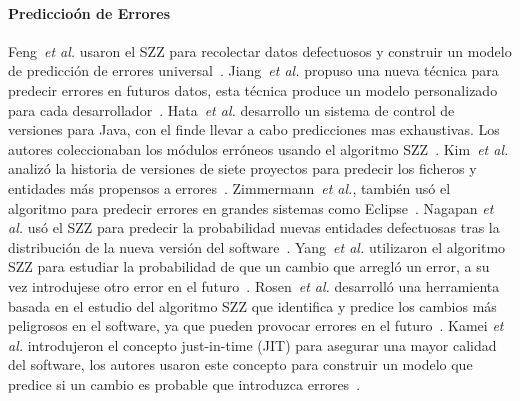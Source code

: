 \documentclass[a4paper, 12pt]{book}
\begin{document}
\paragraph{Prediccio\'on de Errores}
Feng~\textit{et al.} usaron el SZZ para recolectar datos defectuosos y construir un modelo de predicci\'on de errores universal~\cite{zhang2014towards}. Jiang~\textit{et al.} propuso una nueva t\'ecnica para predecir errores en futuros datos, esta t\'ecnica produce un modelo personalizado para cada desarrollador~\cite{jiang2013personalized}.
Hata~\textit{et al.} desarrollo un sistema de control de versiones  para Java, con el finde llevar a cabo predicciones mas exhaustivas. Los autores coleccionaban los m\'odulos err\'oneos usando el algoritmo SZZ~\cite{hata2012bug}. Kim~\textit{et al.} analiz\'o la historia de versiones de siete proyectos para predecir los ficheros y entidades m\'as propensos a errores~\cite{kim2007predicting}. Zimmermann~\emph{et al.}, tambi\'en us\'o el algoritmo para predecir errores en grandes sistemas como Eclipse~\cite{zimmermann2007predicting}. Nagapan \emph{et al.} us\'o el SZZ para predecir la probabilidad nuevas entidades defectuosas tras la distribuci\'on de la nueva versi\'on del software~\cite{nagappan2006mining}. Yang~\textit{et al.} utilizaron el algoritmo SZZ para estudiar la probabilidad de que un cambio que arregl\'o un error, a su vez introdujese otro error en el futuro~\cite{yang2014bug}. Rosen~\textit{et al.} desarroll\'o una herramienta basada en el estudio del algoritmo SZZ que identifica y predice los cambios m\'as peligrosos en el software, ya que pueden provocar errores en el futuro~\cite{rosen2015commit}. Kamei \emph{et al.} introdujeron el concepto just-in-time (JIT) para asegurar una mayor calidad del software, los autores usaron este concepto para construir un modelo que predice si un cambio es probable que introduzca errores~\cite{kamei2013large}.
\end{document}
